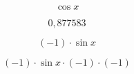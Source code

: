 \documentclass[a4paper]{article}
\begin{document}
$$
\cos{x}
$$

$$
0,877583
$$

$$
\left(-1\right)\cdot{\sin{x}}
$$

$$
\left(-1\right)\cdot{\sin{x}}\cdot{\left(-1\right)}\cdot{\left(-1\right)}
$$
\end{document}
